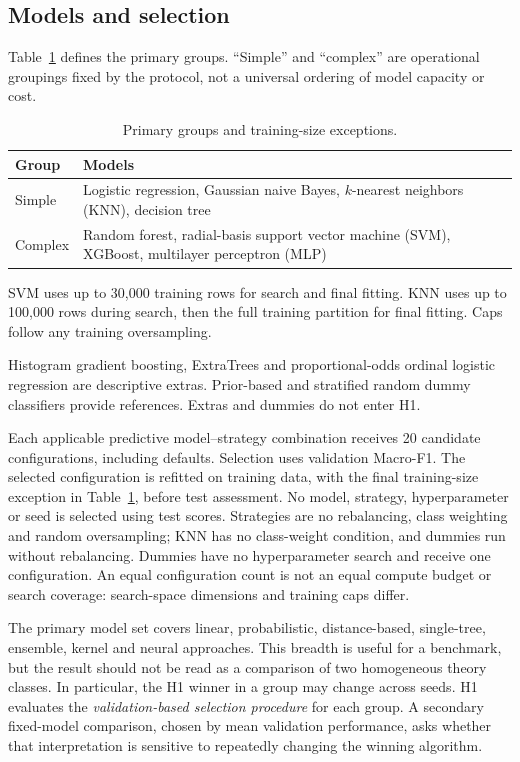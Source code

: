 \subsection{Models and selection}
Table~\ref{tab:models} defines the primary groups. ``Simple'' and ``complex''
are operational groupings fixed by the protocol, not a universal ordering of
model capacity or cost.

\begin{table}[t]
\caption{Primary groups and training-size exceptions.}
\label{tab:models}
\begin{tabular}{@{}p{}p{}@{}}
\toprule
Group & Models \\
\midrule
Simple & Logistic regression, Gaussian naive Bayes, $k$-nearest neighbors (KNN), decision tree \\
Complex & Random forest, radial-basis support vector machine (SVM), XGBoost, multilayer perceptron (MLP) \\
\bottomrule
\end{tabular}
\smallskip

\footnotesize SVM uses up to 30,000 training rows for search and final fitting.
KNN uses up to 100,000 rows during search, then the full training partition for
final fitting. Caps follow any training oversampling.
\end{table}

Histogram gradient boosting, ExtraTrees and proportional-odds ordinal logistic
regression are descriptive extras. Prior-based and stratified random dummy
classifiers provide references. Extras and dummies do not enter H1.

Each applicable predictive model--strategy combination receives 20 candidate
configurations, including defaults. Selection uses validation Macro-F1.
The selected configuration is refitted on training data, with the final
training-size exception in Table~\ref{tab:models}, before test assessment.
No model, strategy, hyperparameter or seed is selected using test scores.
Strategies are no rebalancing, class weighting and random oversampling;
KNN has no class-weight condition, and dummies run without rebalancing.
Dummies have no hyperparameter search and receive one configuration.
An equal configuration count is not an equal compute budget or search
coverage: search-space dimensions and training caps differ.

The primary model set covers linear, probabilistic, distance-based,
single-tree, ensemble, kernel and neural approaches. This breadth is useful
for a benchmark, but the result should not be read as a comparison of two
homogeneous theory classes. In particular, the H1 winner in a group may
change across seeds. H1 evaluates the \emph{validation-based selection
procedure} for each group. A secondary fixed-model comparison, chosen by
mean validation performance, asks whether that interpretation is sensitive
to repeatedly changing the winning algorithm.

